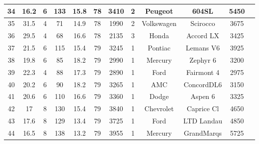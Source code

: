\documentclass[12pt]{report}\usepackage[]{graphicx}\usepackage[]{color}
\begin{document}
\begin{table}[ht!]
\begin{tabular}{c|c|c|c|c|c|c|c|c|c|c|c}
 \hline
34 & 16.2& 6& 133& 15.8& 78& 3410& 2& Peugeot   & 604SL     & 5450&         \\
 \hline
35 & 31.5& 4& 71& 14.9& 78& 1990& 2& Volkswagen& Scirocco  & 3675&         \\
 \hline
36 & 29.5& 4& 68& 16.6& 78& 2135& 3& Honda     & Accord LX & 3425&         \\
 \hline
37 & 21.5& 6& 115& 15.4& 79& 3245& 1& Pontiac   & Lemans V6 & 3925&         \\
 \hline
38 & 19.8& 6& 85& 18.2& 79& 2990& 1& Mercury   & Zephyr 6  & 3200&         \\
 \hline
39 & 22.3& 4& 88& 17.3& 79& 2890& 1& Ford      & Fairmont 4& 2975&         \\
 \hline
40 & 20.2& 6& 90& 18.2& 79& 3265& 1& AMC       & ConcordDL6& 3150&         \\
 \hline
41 & 20.6& 6& 110& 16.6& 79& 3360& 1& Dodge     & Aspen 6   & 3325&         \\
 \hline
42 & 17& 8& 130& 15.4& 79& 3840& 1& Chevrolet & Caprice Cl& 4650&         \\
 \hline
43 & 17.6& 8& 129& 13.4& 79& 3725& 1& Ford      & LTD Landau& 4850&         \\
 \hline
44 & 16.5& 8& 138& 13.2& 79& 3955& 1& Mercury   & GrandMarqs& 5725&         \\
 \end{tabular}
\end{table}
\end{document}
